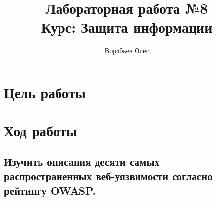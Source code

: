 \documentclass{article}
\title{Лабораторная работа №8 \\ Курс: Защита информации}
\author{Воробьев Олег}
\begin{document}
	\maketitle
	\clearpage
	\tableofcontents
	\clearpage
	
\section{Цель работы}

\section{Ход работы}



\subsection{Изучить описания десяти самых распространенных веб-уязвимости согласно рейтингу OWASP.}
\end{document}

